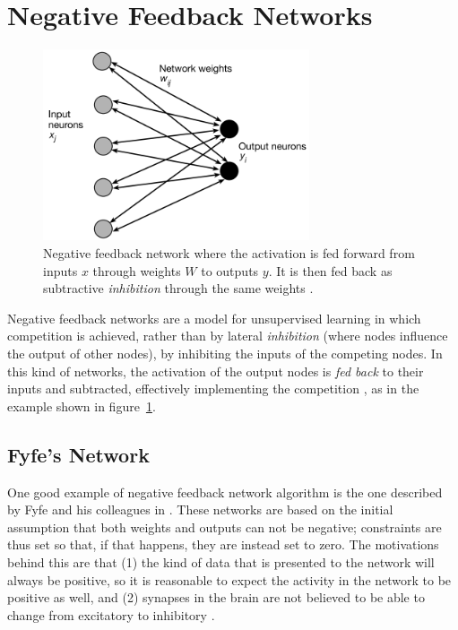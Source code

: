 \documentclass[11pt,a4paper]{report}
\begin{document}
		\newpage		
		
		\section{Negative Feedback Networks}
			\label{sec:negfeedback}
			\begin{figure}[h]
				\centering
				\includegraphics[width=0.7\textwidth]{negfeedback}
				\caption{Negative feedback network where the activation is fed forward from inputs $x$ through weights $W$ to outputs $y$. It is then fed back as subtractive \emph{inhibition} through the same weights \cite{charles1998modelling}.}
				\label{fig:negfeedback}
			\end{figure}
			Negative feedback networks are a model for unsupervised learning in which competition is achieved, rather than by lateral \emph{inhibition} (where nodes influence the output of other nodes), by inhibiting the inputs of the competing nodes. In this kind of networks, the activation of the output nodes is \emph{fed back} to their inputs and subtracted, effectively implementing the competition \cite{spratling2009unsupervised}, as in the example shown in figure~\ref{fig:negfeedback}.
		
			\subsection{Fyfe's Network}
				One good example of negative feedback network algorithm is the one described by Fyfe and his colleagues in \cite{charles1997discovering,charles1998modelling,charles2002unsupervised,fyfe1997neural}. These networks are based on the initial assumption that both weights and outputs can not be negative; constraints are thus set so that, if that happens, they are instead set to zero. The motivations behind this are that (1) the kind of data that is presented to the network will always be positive, so it is reasonable to expect the activity in the network to be positive as well, and (2) synapses in the brain are not believed to be able to change from excitatory to inhibitory \cite{charles1998modelling}.
\end{document}
